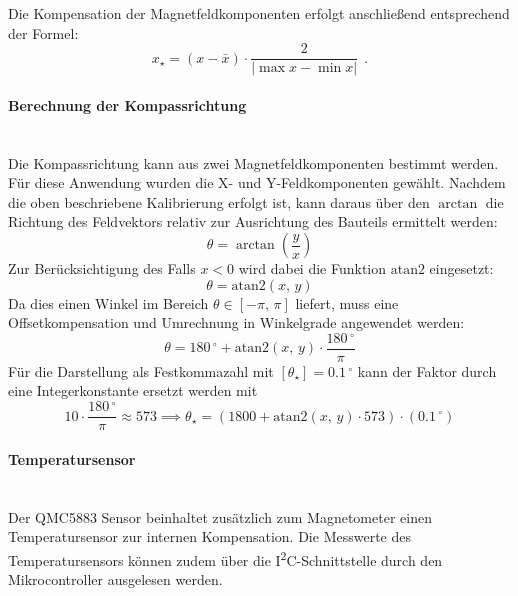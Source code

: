             Die Kompensation der Magnetfeldkomponenten erfolgt anschließend entsprechend der Formel:
            \begin{equation*}
                x_\star = (x - \bar{x}) \cdot \frac{2}{|\max{x} - \min{x}|}~~.
            \end{equation*}
            
            \paragraph{Berechnung der Kompassrichtung}\mbox{}\\
            Die Kompassrichtung kann aus zwei Magnetfeldkomponenten bestimmt werden. Für diese Anwendung wurden die X- und Y-Feldkomponenten gewählt. Nachdem die oben beschriebene Kalibrierung erfolgt ist, kann daraus über den $\arctan$ die Richtung des Feldvektors relativ zur Ausrichtung des Bauteils ermittelt werden:
            \begin{equation*}
                \theta = \arctan\left(\frac{y}{x}\right)
            \end{equation*}
            Zur Berücksichtigung des Falls $x < 0$ wird dabei die Funktion $\mathrm{atan2}$ eingesetzt:
            \begin{equation*}
                \theta = \mathrm{atan2}(x,\,y)
            \end{equation*}
            Da dies einen Winkel im Bereich $\theta \in [-\pi,\,\pi]$ liefert, muss eine Offsetkompensation und Umrechnung in Winkelgrade angewendet werden:
            \begin{equation*}
                \theta = 180\,^\circ + \mathrm{atan2}(x,\,y) \cdot \frac{180\,^\circ}{\pi}
            \end{equation*}
            Für die Darstellung als Festkommazahl mit $[\theta_\star] = 0.1\,^\circ$ kann der Faktor durch eine Integerkonstante ersetzt werden mit
            \begin{equation*}
                10 \cdot \frac{180\,^\circ}{\pi} \approx 573 \implies \theta_\star = (1800 + \mathrm{atan2}(x,\,y) \cdot 573) \cdot (0.1\,^\circ)
            \end{equation*}
        
            \paragraph{Temperatursensor}\mbox{}\\
            Der QMC5883 Sensor beinhaltet zusätzlich zum Magnetometer einen Temperatursensor zur internen Kompensation. Die Messwerte des Temperatursensors können zudem über die I\textsuperscript{2}C-Schnittstelle durch den Mikrocontroller ausgelesen werden.
            
